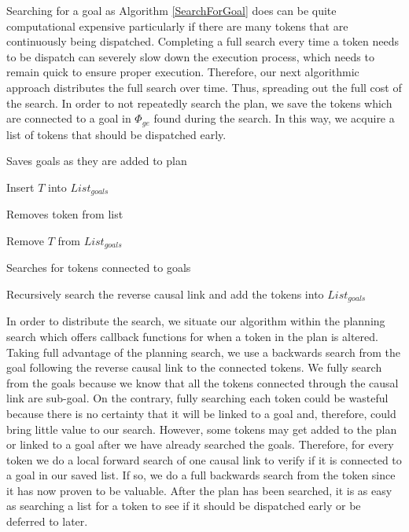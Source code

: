 Searching for a goal as Algorithm \ref{SearchForGoal} does can be quite computational expensive particularly if
there are many tokens that are continuously being dispatched. Completing a full search every time a token 
needs to be dispatch can severely slow down the execution process, which needs to remain quick to ensure 
proper execution. Therefore, our next algorithmic approach distributes the full search over time. 
Thus, spreading out the full cost of the search. In order to not repeatedly search the plan, we save the tokens 
which are connected to a goal in $\Phi_{ge}$ found during the search. In this way, we acquire a list of tokens 
that should be dispatched early. 

\begin{algorithm}
\caption{Saves goals as they are added to plan}
\label{NotifyAdded}
\begin{algorithmic}
	\State Insert $T$ into $List_{goals}$
\EndIf 
\EndFunction
\end{algorithmic}
\end{algorithm}

\begin{algorithm}
\caption{Removes token from list}
\label{NotifyRemoved}
\begin{algorithmic}
	\State Remove $T$ from $List_{goals}$
\EndFunction
\end{algorithmic}
\end{algorithm}

\begin{algorithm}
\caption{Searches for tokens connected to goals}
\label{NotifyActivated}
\begin{algorithmic}
	\State Recursively search the reverse causal link and add the tokens into $List_{goals}$
\EndIf
\EndFunction
\end{algorithmic}
\end{algorithm}

In order to distribute the search, we situate our algorithm within the planning search which
offers callback functions for when a token in the plan is altered. Taking full advantage of the planning 
search, we use a backwards search from the goal following the reverse causal link to the connected tokens. 
We fully search from the goals because we know that all the tokens connected through the causal link are 
sub-goal.  On the contrary, fully searching each token could be wasteful because there is no certainty that 
it will be linked to a goal and, therefore, could bring little value to our search. However, some tokens 
may get added to the plan or linked to a goal after we have already searched the goals. Therefore, for every 
token we do a local forward search of one causal link to verify if it is connected to a goal in our saved list. 
If so, we do a full backwards search from the token since it has now proven to be valuable. After the plan has 
been searched, it is as easy as searching a list for a token to see if it should be dispatched early or be deferred
to later.  




